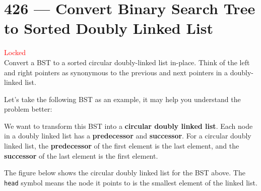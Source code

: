 \section{426 --- Convert Binary Search Tree to Sorted Doubly Linked List}
\textcolor{red}{Locked}
\\
Convert a BST to a sorted circular doubly-linked list in-place. Think of the left and right pointers as synonymous to the previous and next pointers in a doubly-linked list.
\par
Let's take the following BST as an example, it may help you understand the problem better:
\begin{figure}[H]
\end{figure}

We want to transform this BST into a \textbf{circular doubly linked list}. Each node in a doubly linked list has a \textbf{predecessor} and \textbf{successor}. For a circular doubly linked list, the \textbf{predecessor} of the first element is the last element, and the \textbf{successor} of the last element is the first element.
\par
The figure below shows the circular doubly linked list for the BST above. The \texttt{head} symbol means the node it points to is the smallest element of the linked list.
 
